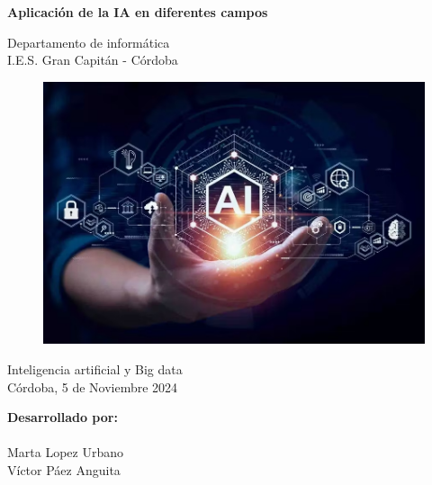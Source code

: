 \documentclass[12pt]{article}
\begin{document}
\begin{titlepage}
    \begin{center}
      \Large \bfseries{}
    \end{center}
    \vspace{0.1cm}
    \begin{center}
      \Large \bfseries{}
    \end{center}
    \vspace{0.1cm}
    \begin{center}
     \Large \bfseries{Aplicación de la IA en diferentes campos}
    \end{center}
    \vspace{0.0001cm}
    \begin{center}
        Departamento de informática \\ I.E.S. Gran Capitán - Córdoba
    \end{center}
        \vspace{2 cm}
\begin{figure}[h!]
    \centering
    \includegraphics[width=.6\textwidth]{ramas_ia_1.jpg}
    \label{fig:my_label}
\end{figure}
    \vspace{0.2 cm}
    \begin{center}
        Inteligencia artificial y Big data \\ Córdoba, 5 de Noviembre 2024
    \end{center}
    \vspace{5 cm}
\null\hfill \textbf{Desarrollado por:}
\\
\\
\null\hfill Marta Lopez Urbano
\\
\null\hfill Víctor Páez Anguita
\clearpage
\end{titlepage}

\tableofcontents
\clearpage
\end{document}
